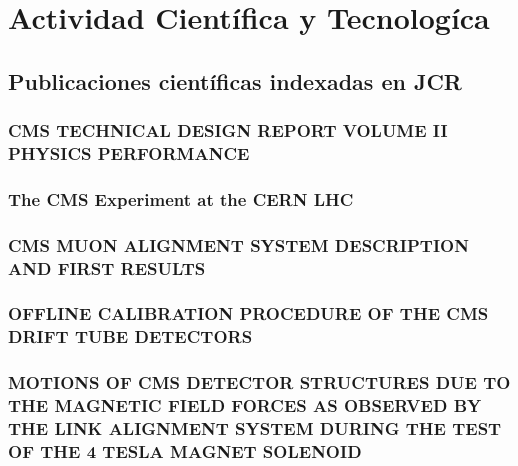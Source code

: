 \documentclass[a4paper, 11pt, twoside, openright]{report}
\begin{document}
\chapter{Actividad Científica y Tecnologíca}

\section{Publicaciones científicas indexadas en JCR}

\subsection{CMS TECHNICAL DESIGN REPORT VOLUME II PHYSICS PERFORMANCE}


\subsection{The CMS Experiment at the CERN LHC}


\subsection{CMS MUON ALIGNMENT SYSTEM DESCRIPTION AND FIRST RESULTS}


\subsection{OFFLINE CALIBRATION PROCEDURE OF THE CMS DRIFT TUBE DETECTORS}


\subsection{MOTIONS OF CMS DETECTOR STRUCTURES DUE TO THE MAGNETIC FIELD FORCES AS OBSERVED BY THE LINK ALIGNMENT SYSTEM DURING THE TEST OF THE 4 TESLA MAGNET SOLENOID}

\end{document}
